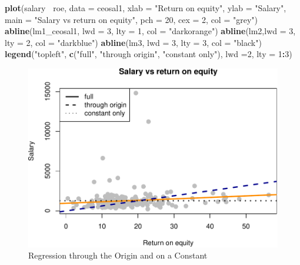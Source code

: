 \documentclass[]{book}
\newenvironment{Shaded}{\begin{snugshade}}{\end{snugshade}}
\newcommand{\DataTypeTok}[1]{\textcolor[rgb]{0.13,0.29,0.53}{#1}}
\newcommand{\DecValTok}[1]{\textcolor[rgb]{0.00,0.00,0.81}{#1}}
\newcommand{\KeywordTok}[1]{\textcolor[rgb]{0.13,0.29,0.53}{\textbf{#1}}}
\newcommand{\NormalTok}[1]{#1}
\newcommand{\OperatorTok}[1]{\textcolor[rgb]{0.81,0.36,0.00}{\textbf{#1}}}
\newcommand{\StringTok}[1]{\textcolor[rgb]{0.31,0.60,0.02}{#1}}
\begin{document}
\begin{Shaded}
\begin{Highlighting}[]
\KeywordTok{plot}\NormalTok{(salary}\OperatorTok{~}\StringTok{ }\NormalTok{roe, }\DataTypeTok{data =}\NormalTok{ ceosal1,}
     \DataTypeTok{xlab =} \StringTok{"Return on equity"}\NormalTok{,}
     \DataTypeTok{ylab =} \StringTok{"Salary"}\NormalTok{,}
     \DataTypeTok{main =} \StringTok{"Salary vs return on equity"}\NormalTok{,}
     \DataTypeTok{pch  =} \DecValTok{20}\NormalTok{,}
     \DataTypeTok{cex  =} \DecValTok{2}\NormalTok{,}
     \DataTypeTok{col  =} \StringTok{"grey"}\NormalTok{)}
\KeywordTok{abline}\NormalTok{(lm1_ceosal1, }\DataTypeTok{lwd =} \DecValTok{3}\NormalTok{, }\DataTypeTok{lty =} \DecValTok{1}\NormalTok{, }\DataTypeTok{col =} \StringTok{"darkorange"}\NormalTok{)}
\KeywordTok{abline}\NormalTok{(lm2,}\DataTypeTok{lwd =} \DecValTok{3}\NormalTok{,  }\DataTypeTok{lty =} \DecValTok{2}\NormalTok{,   }\DataTypeTok{col =} \StringTok{"darkblue"}\NormalTok{)}
\KeywordTok{abline}\NormalTok{(lm3, }\DataTypeTok{lwd =} \DecValTok{3}\NormalTok{,  }\DataTypeTok{lty =} \DecValTok{3}\NormalTok{,   }\DataTypeTok{col =} \StringTok{"black"}\NormalTok{)}
\KeywordTok{legend}\NormalTok{(}\StringTok{"topleft"}\NormalTok{, }
       \KeywordTok{c}\NormalTok{(}\StringTok{"full"}\NormalTok{, }
         \StringTok{"through origin"}\NormalTok{, }
         \StringTok{"constant only"}\NormalTok{), }
       \DataTypeTok{lwd =}\DecValTok{2}\NormalTok{, }
       \DataTypeTok{lty =} \DecValTok{1}\OperatorTok{:}\DecValTok{3}\NormalTok{)}
\end{Highlighting}
\end{Shaded}

\begin{figure}

{\centering \includegraphics[width=0.8\linewidth]{MEM5220_R_files/figure-latex/fig3-1} 

}

\caption{Regression through the Origin and on a Constant}\label{fig:fig3}
\end{figure}
\end{document}
